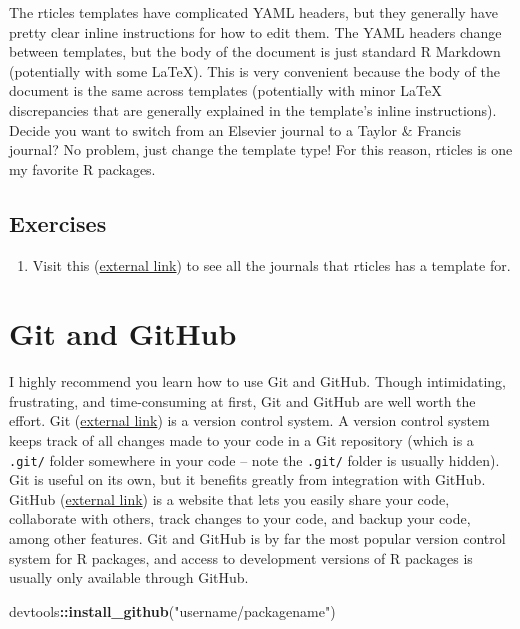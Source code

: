 \documentclass[
]{book}
\newenvironment{Shaded}{\begin{snugshade}}{\end{snugshade}}
\newcommand{\KeywordTok}[1]{\textcolor[rgb]{0.13,0.29,0.53}{\textbf{#1}}}
\newcommand{\NormalTok}[1]{#1}
\newcommand{\OperatorTok}[1]{\textcolor[rgb]{0.81,0.36,0.00}{\textbf{#1}}}
\newcommand{\StringTok}[1]{\textcolor[rgb]{0.31,0.60,0.02}{#1}}
\providecommand{\tightlist}{%
  \setlength{\itemsep}{0pt}\setlength{\parskip}{0pt}}
\begin{document}
The rticles templates have complicated YAML headers, but they generally have pretty clear inline instructions for how to edit them. The YAML headers change between templates, but the body of the document is just standard R Markdown (potentially with some LaTeX). This is very convenient because the body of the document is the same across templates (potentially with minor LaTeX discrepancies that are generally explained in the template's inline instructions). Decide you want to switch from an Elsevier journal to a Taylor \& Francis journal? No problem, just change the template type! For this reason, rticles is one my favorite R packages.

\hypertarget{ex-set13}{%
\subsection{Exercises}\label{ex-set13}}

\begin{enumerate}
\def\labelenumi{\arabic{enumi}.}
\tightlist
\item
  Visit this (\href{https://github.com/rstudio/rticles}{external link}) to see all the journals that rticles has a template for.
\end{enumerate}

\hypertarget{git-github}{%
\section{Git and GitHub}\label{git-github}}

I highly recommend you learn how to use Git and GitHub. Though intimidating, frustrating, and time-consuming at first, Git and GitHub are well worth the effort. Git (\href{https://git-scm.com/}{external link}) is a version control system. A version control system keeps track of all changes made to your code in a Git repository (which is a \texttt{.git/} folder somewhere in your code -- note the \texttt{.git/} folder is usually hidden). Git is useful on its own, but it benefits greatly from integration with GitHub. GitHub (\href{https://github.com/}{external link}) is a website that lets you easily share your code, collaborate with others, track changes to your code, and backup your code, among other features. Git and GitHub is by far the most popular version control system for R packages, and access to development versions of R packages is usually only available through GitHub.

\begin{Shaded}
\begin{Highlighting}[]
\NormalTok{devtools}\OperatorTok{::}\KeywordTok{install_github}\NormalTok{(}\StringTok{"username/packagename"}\NormalTok{)}
\end{Highlighting}
\end{Shaded}
\end{document}
